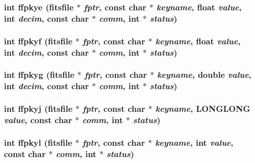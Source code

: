 \subsubsection{\setlength{\rightskip}{0pt plus 5cm}int ffpkye (\bf{fitsfile} $\ast$ {\em fptr}, const char $\ast$ {\em keyname}, float {\em value}, int {\em decim}, const char $\ast$ {\em comm}, int $\ast$ {\em status})}\label{test_2shm__client_2fitsio_8h_f213a848d9e60bacc5e630460e6d6351}


\subsubsection{\setlength{\rightskip}{0pt plus 5cm}int ffpkyf (\bf{fitsfile} $\ast$ {\em fptr}, const char $\ast$ {\em keyname}, float {\em value}, int {\em decim}, const char $\ast$ {\em comm}, int $\ast$ {\em status})}\label{test_2shm__client_2fitsio_8h_a67275524042e4941d1810f028d25997}


\subsubsection{\setlength{\rightskip}{0pt plus 5cm}int ffpkyg (\bf{fitsfile} $\ast$ {\em fptr}, const char $\ast$ {\em keyname}, double {\em value}, int {\em decim}, const char $\ast$ {\em comm}, int $\ast$ {\em status})}\label{test_2shm__client_2fitsio_8h_2538957e7c13467598770082a8fbf249}


\subsubsection{\setlength{\rightskip}{0pt plus 5cm}int ffpkyj (\bf{fitsfile} $\ast$ {\em fptr}, const char $\ast$ {\em keyname}, \bf{LONGLONG} {\em value}, const char $\ast$ {\em comm}, int $\ast$ {\em status})}\label{test_2shm__client_2fitsio_8h_5889d9051a64cb2a6aefcec388abfbd8}


\subsubsection{\setlength{\rightskip}{0pt plus 5cm}int ffpkyl (\bf{fitsfile} $\ast$ {\em fptr}, const char $\ast$ {\em keyname}, int {\em value}, const char $\ast$ {\em comm}, int $\ast$ {\em status})}\label{test_2shm__client_2fitsio_8h_e670649a23f7590da9a138dc0ae7c22a}


